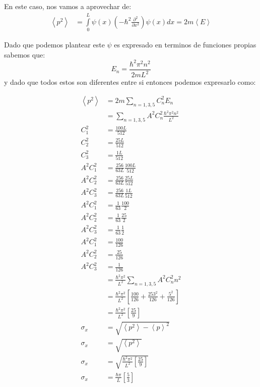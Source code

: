 \documentclass{report}
\begin{document}
\subsection{}

En este caso, nos vamos a aprovechar de:
\begin{align*}
  \left< p^2 \right> &= \int\limits_0^L \psi(x)\left( -\hbar^2 \frac{\partial^2}{\partial x^2}\right)\psi(x) dx = 2m\left<E\right>
\end{align*}

Dado que podemos plantear este $\psi$ es expresado en terminos de funciones propias sabemos que: \[E_n = \frac{\hbar^2\pi^2n^2}{2mL^2}\] y dado que todos estos son diferentes entre si entonces podemos expresarlo como:

\begin{align*}
  \left<p^2\right> &= 2m \sum_{n = 1, 3, 5} C_n^2 E_n\\
  &= \sum_{n = 1, 3, 5} A^2 C_n^2 \frac{\hbar^2\pi^2n^2}{L^2}\\
  C_1^2 &= \frac{100L}{512}\\
  C_2^2 &= \frac{25 L}{512}\\
  C_3^2 &= \frac{1 L}{512}\\
  A^2 C_1^2 &= \frac{256}{63 L}\frac{100L}{512}\\
  A^2 C_2^2 &= \frac{256}{63 L}\frac{25 L}{512}\\
  A^2 C_3^2 &= \frac{256}{63 L}\frac{1  L}{512}\\
  A^2 C_1^2 &= \frac{1}{63}\frac{100}{2}\\
  A^2 C_2^2 &= \frac{1}{63}\frac{25 }{2}\\
  A^2 C_3^2 &= \frac{1}{63}\frac{1  }{2}\\
  A^2 C_1^2 &= \frac{100}{126}\\
  A^2 C_2^2 &= \frac{25 }{126}\\
  A^2 C_3^2 &= \frac{1  }{126}\\
  &= \frac{\hbar^2\pi^2}{L^2}\sum_{n = 1, 3, 5} A^2 C_n^2 n^2 \\
  &= \frac{\hbar^2\pi^2}{L^2}\left[\frac{100}{126} + \frac{25 3^2}{126} + \frac{5^2}{126}\right] \\
  &= \frac{\hbar^2\pi^2}{L^2}\left[\frac{25}{9}\right] \\
  \sigma_x &= \sqrt{\left<p^2\right> - \left<p\right>^2}\\
  \sigma_x &= \sqrt{\left<p^2\right>}\\
  \sigma_x &= \sqrt{\frac{\hbar^2\pi^2}{L^2}\left[\frac{25}{9}\right] }\\
  \sigma_x &= \frac{\hbar\pi}{L}\left[\frac{5}{3}\right]\\
\end{align*}
\end{document}
